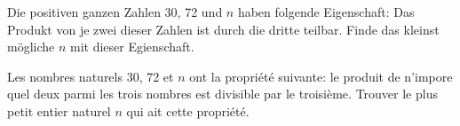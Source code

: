 Die positiven ganzen Zahlen 30, 72 und $n$ haben folgende Eigenschaft: Das Produkt von je zwei dieser Zahlen ist durch die dritte teilbar. Finde das kleinst mögliche $n$ mit dieser Egienschaft.

\bigskip

Les nombres naturels 30, 72 et $n$ ont la propriété suivante: le produit de n'impore quel deux parmi les trois nombres est divisible par le troisième. Trouver le plus petit entier naturel $n$ qui ait cette propriété.